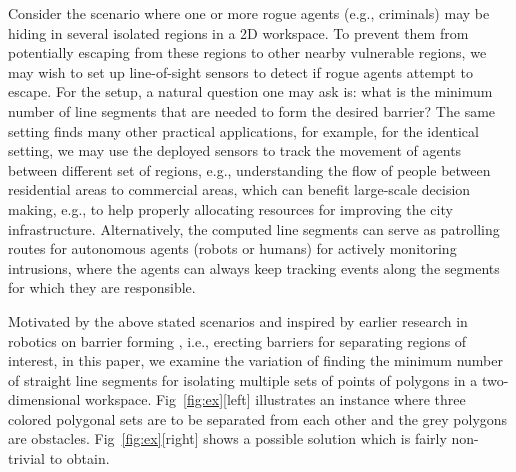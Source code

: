 Consider the scenario where one or more rogue agents (e.g., criminals) may be hiding in several isolated regions in a 2D workspace. To prevent them from potentially escaping from these regions to other nearby vulnerable regions, we may wish to set up line-of-sight sensors to detect if rogue agents attempt to escape. For the setup, a natural question one may ask is: what is the minimum number of line segments that are needed to form the desired barrier? The same setting finds many other practical applications, for example, for the identical setting, we may use the deployed sensors to track the movement of agents between different set of regions, e.g., understanding the flow of people between residential areas to commercial areas, which can benefit large-scale decision making, e.g., to help properly allocating resources for improving the city infrastructure. 
%
Alternatively, the computed line segments can serve as patrolling routes for autonomous agents (robots or humans) for actively monitoring intrusions, where the agents can always keep tracking events along the segments for which they are responsible.

%
Motivated by the above stated scenarios and inspired by earlier research in robotics on barrier forming \cite{kloder2007barrier,kloder2008partial}, i.e., erecting barriers for separating regions of interest, in this paper, we examine the variation of finding the minimum number of straight line segments for isolating multiple sets of points of polygons in a two-dimensional workspace. Fig~\ref{fig:ex}[left] illustrates an instance where three colored polygonal sets are to be separated from each other and the grey polygons are obstacles. Fig~\ref{fig:ex}[right] shows a possible solution which is fairly non-trivial 
to obtain. 
%


